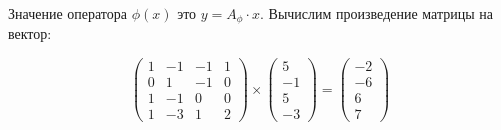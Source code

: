 \documentclass{article}
\begin{document}
\begin{center}
Значение оператора $\phi(x)$ это $y = A_\phi\cdot x$. Вычислим произведение матрицы на вектор:
\end{center}
\noindent$$\left(\begin{array}{crrc}
1 & -1 & -1 & 1 \\
0 & 1 & -1 & 0 \\
1 & -1 & 0 & 0 \\
1 & -3 & 1 & 2
\end{array}\right) \times \left(\begin{array}{r}
5 \\ -1 \\ 5 \\ -3
\end{array}\right) = \left(\begin{array}{r}
-2 \\ -6 \\ 6 \\ 7
\end{array}\right)$$
\end{document}
